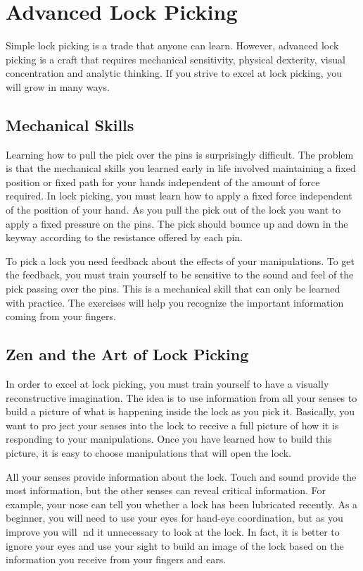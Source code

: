\chapter{Advanced Lock Picking}
Simple lock picking is a trade that anyone can learn. However, advanced lock picking is a craft
that requires mechanical sensitivity, physical dexterity, visual concentration and analytic
thinking. If you strive to excel at lock picking, you will grow in many ways.

\section{Mechanical Skills}
Learning how to pull the pick over the pins is surprisingly difficult. The problem is that the
mechanical skills you learned early in life involved maintaining a fixed position or fixed path
for your hands independent of the amount of force required. In lock picking, you must learn
how to apply a fixed force independent of the position of your hand. As you pull the pick
out of the lock you want to apply a fixed pressure on the pins. The pick should bounce up
and down in the keyway according to the resistance offered by each pin.

To pick a lock you need feedback about the effects of your manipulations. To get the
feedback, you must train yourself to be sensitive to the sound and feel of the pick passing
over the pins. This is a mechanical skill that can only be learned with practice. The exercises
will help you recognize the important information coming from your fingers.

\section{Zen and the Art of Lock Picking}
In order to excel at lock picking, you must train yourself to have a visually reconstructive
imagination. The idea is to use information from all your senses to build a picture of what
is happening inside the lock as you pick it. Basically, you want to pro ject your senses into
the lock to receive a full picture of how it is responding to your manipulations. Once you
have learned how to build this picture, it is easy to choose manipulations that will open the
lock.

All your senses provide information about the lock. Touch and sound provide the most
information, but the other senses can reveal critical information. For example, your nose
can tell you whether a lock has been lubricated recently. As a beginner, you will need to use your eyes for hand-eye coordination, but as you improve you will nd it unnecessary to look
at the lock. In fact, it is better to ignore your eyes and use your sight to build an image of
the lock based on the information you receive from your fingers and ears.

